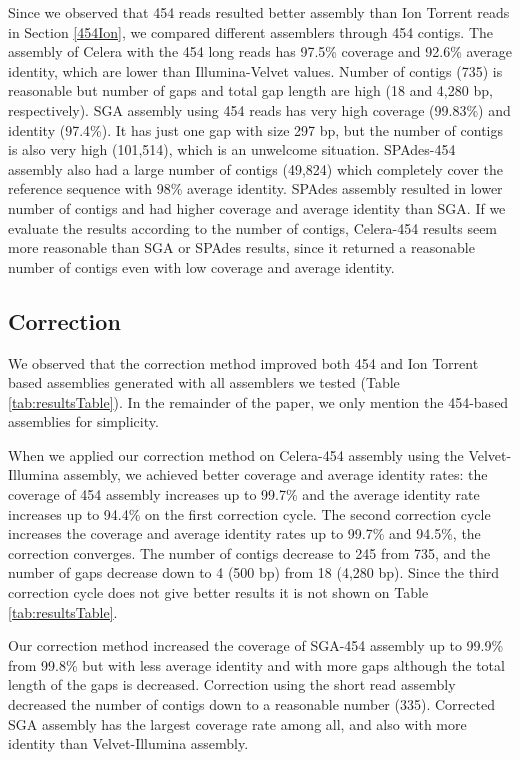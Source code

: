 \documentclass{llncs}
\begin{document}
Since we observed that 454 reads resulted better assembly than Ion Torrent reads in Section \ref{454Ion}, we compared different assemblers through 454 contigs. The assembly of Celera with the 454 long reads has 97.5\% coverage and 92.6\% average identity, which are lower than Illumina-Velvet values. Number of contigs (735) is reasonable but number of gaps and total gap length are high (18 and 4,280 bp, respectively). 
SGA assembly using 454 reads has very high coverage (99.83\%) and identity (97.4\%). It has just one gap with size 297 bp, but the number of contigs is also very high (101,514), which is an unwelcome situation. SPAdes-454 assembly also had a large number of contigs (49,824) which completely cover the reference sequence with 98\% average identity. SPAdes assembly resulted in lower number of contigs  and had higher coverage and average identity than SGA. 
If we evaluate the results according to the number of contigs, Celera-454 results seem more reasonable than SGA or SPAdes results, since it returned a reasonable number of contigs even with low coverage and average identity.

\subsection{Correction}

We observed that the correction method improved both 454 and Ion Torrent based assemblies generated with all assemblers we tested (Table \ref{tab:resultsTable}). In the remainder of the paper, we only
mention the 454-based assemblies for simplicity.

When we applied our correction method on Celera-454 assembly using the Velvet-Illumina assembly, we achieved better coverage and average identity rates: the coverage of 454 assembly increases up to 99.7\% and the average identity rate increases up to 94.4\% on the first correction cycle. The second correction cycle increases the coverage and average identity rates up to 99.7\% and 94.5\%, the correction converges. The number of contigs decrease to 245 from 735, and the number of gaps decrease down to 4 (500 bp) from 18 (4,280 bp). Since the third correction cycle does not give better results it is not shown on Table \ref{tab:resultsTable}.

Our correction method increased the coverage of SGA-454 assembly up to 99.9\% from 99.8\% but with less average identity and with more gaps although the total length of the gaps is decreased. Correction using the short read assembly decreased the number of contigs down to a reasonable number (335). Corrected SGA assembly has the largest coverage rate among all, and also with more identity than Velvet-Illumina assembly.
\end{document}
